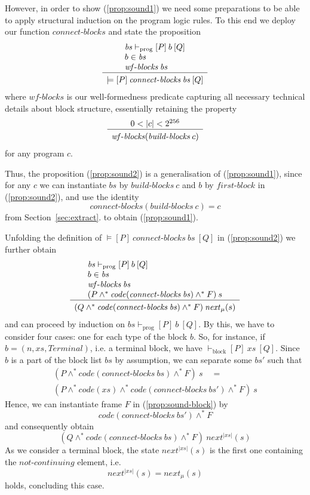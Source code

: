\documentclass[sigplan,10pt]{acmart}\settopmatter{printfolios=true,printccs=false,printacmref=false}
\newcommand{\sconj}{\wedge^*}
\newcommand{\tvalid}[3]{\models[#1]\:#2\:[#3]}
\newcommand{\ttrip}[5]{\mathit{#1} \vdash_{\mathrm{#2}}[#3]\:#4\:[#5]}
\newcommand{\xnext}{\mathit{next}}
\newcommand{\code}[1]{\mathit{code}(#1)}
\newcommand{\ncont}{\mathit{not\mbox{-}continuing}}
\newcommand{\RuleC}[2]{\begin{array}{c}#1\\\hline\noalign{\smallskip}#2\end{array}}
\newcommand{\bblocks}{\mathit{build\mbox{-}blocks}}
\newcommand{\cblocks}{\mathit{connect\mbox{-}blocks}}
\newcommand{\fblock}{\mathit{first\mbox{-}block}}
\newcommand{\len}[1]{|#1|}
\newcommand{\wfblocks}{\mathit{wf\mbox{-}blocks}}
\begin{document}
However, in order to show (\ref{prop:sound1}) we need some preparations to be able to apply
structural induction on the program logic rules. To this end we deploy our function $\cblocks$
and state the proposition
\begin{equation}
\label{prop:sound2}
\RuleC{\begin{array}{l}
       \ttrip{\mathit{bs}}{prog}{P}{b}{Q} \\
       b \in \mathit{bs}\\
       \wfblocks\:\mathit{bs}
       \end{array}}
{\tvalid{P}{\cblocks \: \mathit{bs}}{Q}}
\end{equation}
where $\wfblocks$ is our well-formedness predicate capturing all necessary technical details about block
structure, essentially retaining the property 
\[
\RuleC{0 < \len{c} < 2^{256}}
{\wfblocks(\bblocks \: c)}
\] 
for any program $c$. 

Thus, the proposition (\ref{prop:sound2}) is a generalisation of
(\ref{prop:sound1}), since for any $c$ we can instantiate $\mathit{bs}$ by $\bblocks \: c$ 
and $b$ by $\fblock$ in (\ref{prop:sound2}), and use the identity 
\[
\cblocks(\bblocks\:c) = c
\] 
from Section~\ref{sec:extract}.
to obtain (\ref{prop:sound1}). 

Unfolding the definition of $\tvalid{P}{\cblocks \: \mathit{bs}}{Q}$ in
(\ref{prop:sound2}) we further obtain
\begin{equation}
\label{prop:sound3}
\RuleC{\begin{array}{l}
       \ttrip{\mathit{bs}}{prog}{P}{b}{Q} \\
       b \in \mathit{bs}\\
       \wfblocks\:\mathit{bs} \\
      (P \sconj \code{\cblocks \: \mathit{bs}} \sconj F)\: s
       \end{array}}
{(Q \sconj \code{\cblocks \: \mathit{bs}} \sconj F)\: \xnext_\mu(s)}
\end{equation}
and can proceed by induction on $\ttrip{\mathit{bs}}{prog}{P}{b}{Q}$.
By this, we have to consider four cases: one for each type of the block $b$.
So, for instance, if $b = (n, \mathit{xs}, \mathit{Terminal})$, i.e. a terminal block,
we have $\ttrip{}{block}{P}{\mathit{xs}}{Q}$. 
Since $b$ is a part of the block list $\mathit{bs}$ by assumption, we can separate some $\mathit{bs'}$ 
such that 
\[
\begin{array}{l}
(P \sconj \code{\cblocks \: \mathit{bs}} \sconj F)\: s \quad = \\
(P \sconj \code{\mathit{xs}} \sconj \code{\cblocks \: \mathit{bs'}} \sconj F)\: s 
\end{array}
\] 
Hence, we can instantiate frame $F$ in (\ref{prop:sound-block}) by
\[
\code{\cblocks \: \mathit{bs}'} \sconj F
\]
and consequently obtain 
\[
(Q \sconj \code{\cblocks \: \mathit{bs}} \sconj F)\: \xnext^{\len{\mathit{xs}}}(s)
\]
As we consider a terminal block, the state 
$\xnext^{\len{\mathit{xs}}}(s)$ is the first one containing the $\ncont$ element, i.e.
\[
\xnext^{\len{\mathit{xs}}}(s) = \xnext_\mu(s)
\]
holds, concluding this case.
\end{document}
